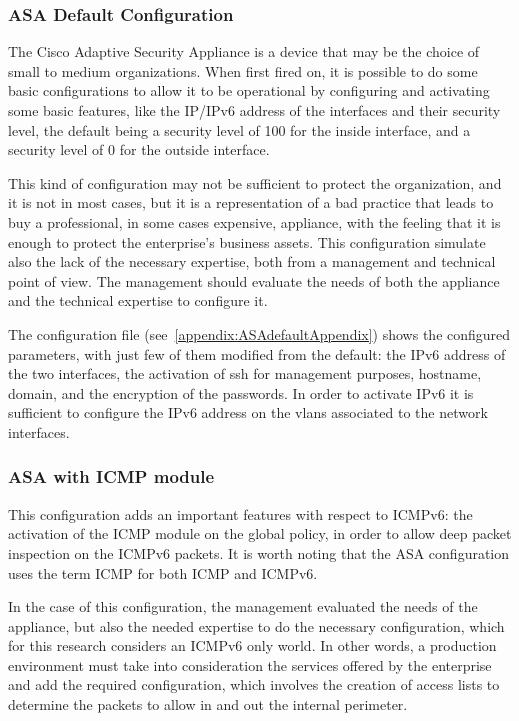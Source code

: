 \documentclass[12pt]{article}
\begin{document}
\subsubsection{ASA Default Configuration}
\label{subsub:asaDefault}

The Cisco Adaptive Security Appliance is a device that may be the choice of small to medium organizations. When first fired on, it is possible to do some basic configurations to allow it to be operational by configuring and activating some basic features, like the IP/IPv6 address of the interfaces and their security level, the default being a security level of 100 for the inside interface, and a security level of 0 for the outside interface.

This kind of configuration may not be sufficient to protect the organization, and it is not in most cases, but it is a representation of a bad practice that leads to buy a professional, in some cases expensive, appliance, with the feeling that it is enough to protect the enterprise's business assets. This configuration simulate also the lack of the necessary expertise, both from a management and technical point of view. The management should evaluate the needs of both the appliance and the technical expertise to configure it.

The configuration file (see~\ref{appendix:ASAdefaultAppendix}) shows the configured parameters, with just few of them modified from the default: the IPv6 address of the two interfaces, the activation of ssh for management purposes, hostname, domain, and the encryption of the passwords. In order to activate IPv6 it is sufficient to configure the IPv6 address on the vlans associated to the network interfaces.

\subsubsection{ASA with ICMP module}
\label{subsub:asaDefaultICMP}

This configuration adds an important features with respect to ICMPv6: the activation of the ICMP module on the global policy, in order to allow deep packet inspection on the ICMPv6 packets. It is worth noting that the ASA configuration uses the term ICMP for both ICMP and ICMPv6.

In the case of this configuration, the management evaluated the needs of the appliance, but also the needed expertise to do the necessary configuration, which for this research considers an ICMPv6 only world. In other words, a production environment must take into consideration the services offered by the enterprise and add the required configuration, which involves the creation of access lists to determine the packets to allow in and out the internal perimeter.
\end{document}
